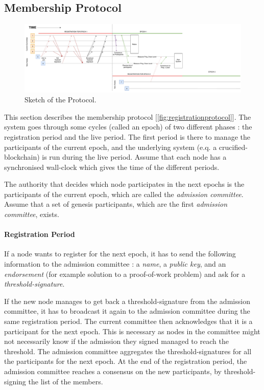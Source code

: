 \documentclass[a4paper,11pt,oneside]{report}
\begin{document}
\subsection{Membership Protocol}

\begin{figure}
\centering
\includegraphics[width=700pt]{figures/Registrationprotocol}
\caption{Sketch of the Protocol.}
\label{fig:registrationprotocol}
\end{figure}

This section describes the membership protocol [\autoref{fig:registrationprotocol}].
The system goes through some cycles (called an epoch) of two different phases :
the registration period and the live period. The first period is there
to manage the participants of the current epoch, and the underlying system
(e.q. a crucified-blockchain) is run during the live period. Assume
that each node has a synchronised wall-clock which gives the time of the
different periods.

The authority that decides which node participates in the next epochs is
the participants of the current epoch, which are called the \textit{admission
committee}. Assume that a set of genesis participants, which are the first
 \textit{admission committee}, exists.

\paragraph{Registration Period}
If a node wants to register for the next epoch, it has to send the following
information to the admission committee : a \textit{name}, a \textit{public key}, and an
 \textit{endorsement} (for example solution to a proof-of-work problem) and ask for a
 \textit{threshold-signature}. 

If the new node manages to get back a threshold-signature from the admission
committee, it has to broadcast it again to the admission committee during the
same registration period. The current committee then acknowledges that it
is a participant for the next epoch. This is necessary as nodes in the
committee might not necessarily know if the admission they signed managed to
reach the threshold. The admission committee aggregates the
threshold-signatures for all the participants for the next epoch. At the end of
the registration period, the admission committee reaches a consensus on the
new participants, by threshold-signing the list of the members.  
\end{document}
